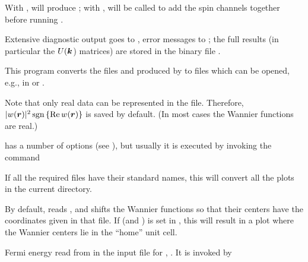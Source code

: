 With , \wannierx will produce ; with
, \wiiwaddsp will be called to add the spin channels
together before running \wannierx.

Extensive diagnostic output goes to , error messages
to ; the full results (in particular the $U(\boldsymbol k$)
matrices) are stored in the binary file .



This program converts the files  and
 produced by \wplot to files
 which can be opened, e.g., in
\xcrys \cite{xcrys} or \vesta \cite{vesta}.

Note that only real data can be represented in the  file.
Therefore, $|w(\boldsymbol r)|^2 \operatorname{sgn}\left\{\mathop{\operatorname{Re}} w(\boldsymbol r)\right\}$ is saved by
default.  (In most cases the Wannier functions are real.)

 has a number of options (see ),
but usually it is executed by invoking the command
%
\begin{usage}
  \wplottoxsf [-up|-dn]
\end{usage}
%
If all the required files have their standard names, this will convert
all the plots in the current directory.

By default,  reads , and
shifts the Wannier functions so that their centers have the
coordinates given in that file.  If  (and
) is set in , this will result in a
plot where the Wannier centers lie in the ``home'' unit cell.



Fermi energy read from  in the input file for
, . It is invoked by
%
\begin{usage}
  \writeinsp [-up|-dn]
\end{usage}



